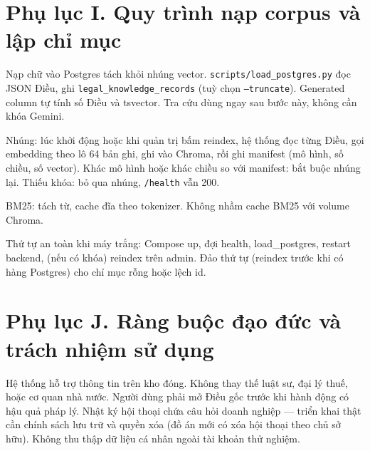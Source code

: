 \section*{Phụ lục I. Quy trình nạp corpus và lập chỉ mục}

Nạp chữ vào Postgres tách khỏi nhúng vector. \texttt{scripts/load\_postgres.py}
đọc JSON Điều, ghi \texttt{legal\_knowledge\_records} (tuỳ chọn
\texttt{--truncate}). Generated column tự tính số Điều và tsvector. Tra cứu dùng
ngay sau bước này, không cần khóa Gemini.

Nhúng: lúc khởi động hoặc khi quản trị bấm reindex, hệ thống đọc từng Điều, gọi
embedding theo lô 64 bản ghi, ghi vào Chroma, rồi ghi manifest (mô hình, số
chiều, số vector). Khác mô hình hoặc khác chiều so với
manifest: bắt buộc nhúng lại. Thiếu khóa: bỏ qua nhúng, \texttt{/health} vẫn 200.

BM25: tách từ, cache đĩa theo tokenizer. Không nhầm cache BM25 với volume
Chroma.

Thứ tự an toàn khi máy trắng: Compose up, đợi health, load\_postgres, restart
backend, (nếu có khóa) reindex trên admin. Đảo thứ tự (reindex trước khi có
hàng Postgres) cho chỉ mục rỗng hoặc lệch id.

\section*{Phụ lục J. Ràng buộc đạo đức và trách nhiệm sử dụng}

Hệ thống hỗ trợ thông tin trên kho đóng. Không thay thế luật sư, đại lý thuế,
hoặc cơ quan nhà nước. Người dùng phải mở Điều gốc trước khi hành động có hậu
quả pháp lý. Nhật ký hội thoại chứa câu hỏi doanh nghiệp --- triển khai thật
cần chính sách lưu trữ và quyền xóa (đồ án mới có xóa hội thoại theo chủ sở
hữu). Không thu thập dữ liệu cá nhân ngoài tài khoản thử nghiệm.
